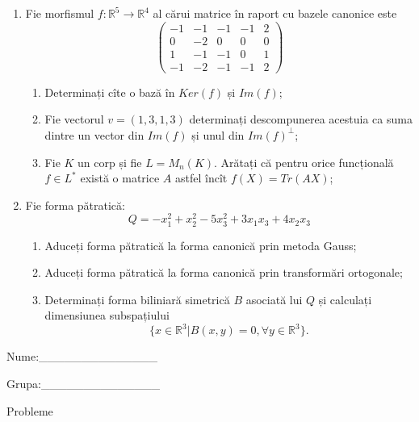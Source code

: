 \documentclass{article}
\begin{document}
\begin{enumerate}
 \item Fie morfismul $f:\mathbb{R}^5 \to \mathbb{R}^4$ al cărui matrice în raport cu bazele canonice este
$$\begin{pmatrix}
-1&-1&-1&-1&2\\
0&-2&0&0&0\\
1&-1&-1&0&1\\
-1&-2&-1&-1&2
\end{pmatrix}$$

\begin{enumerate}
\item Determinați cîte o bază în $Ker(f)$ și $Im(f)$;
\item Fie vectorul $v=(1,3,1,3)$ determinați descompunerea acestuia ca suma dintre un vector din $Im(f)$ și unul din $Im(f)^\perp$;
\item Fie $K$ un corp și fie $L=M_n(K)$. Arătați că pentru orice funcțională $f \in L^*$ există o matrice $A$ astfel încît $f(X)=Tr(AX)$;
\end{enumerate}
\item Fie forma pătratică:
$$Q= -x_1^2+x_2^2-5x_3^2+3x_1x_3+4x_2x_3$$

\begin{enumerate}
\item Aduceți forma pătratică la forma canonică prin metoda Gauss;
\item Aduceți forma pătratică la forma canonică prin transformări ortogonale;
\item Determinați forma biliniară simetrică $B$ asociată lui $Q$ și calculați dimensiunea subspațiului
$$\{x \in \mathbb{R}^3 | B(x,y)=0,\forall y \in \mathbb{R}^3\}.$$

\end{enumerate}
\end{enumerate}
\newpage
\begin{flushright}
Nume:\_\_\_\_\_\_\_\_\_\_\_\_\_\_
 
 
Grupa:\_\_\_\_\_\_\_\_\_\_\_\_\_\_
\end{flushright}
\begin{center}
\vspace{2cm}
{\Large Probleme}
\vspace{2cm}
\end{center}
\end{document}
